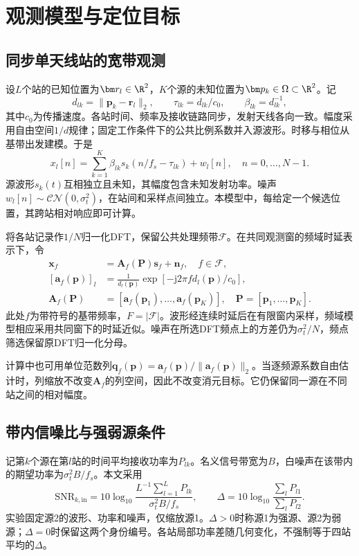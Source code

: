 \section{观测模型与定位目标}\label{sec:model}
\subsection{同步单天线站的宽带观测}
设$L$个站的已知位置为$\bm r_l\in\R^2$，$K$个源的未知位置为$\bm p_k\in\Omega\subset\R^2$。记
\begin{equation}
 d_{lk}=\|\bm p_k-\bm r_l\|_2,\qquad
 \tau_{lk}=d_{lk}/c_0,\qquad \beta_{lk}=d_{lk}^{-1},
 \label{eq:distance}
\end{equation}
其中$c_0$为传播速度。各站时间、频率及接收链路同步，发射天线各向一致。幅度采用自由空间$1/d$规律；固定工作条件下的公共比例系数并入源波形。时移与相位从基带出发建模。于是
\begin{equation}
 x_l[n]=\sum_{k=1}^{K}\beta_{lk}s_k(n/f_s-\tau_{lk})+w_l[n],
 \quad n=0,\ldots,N-1 .\label{eq:time}
\end{equation}
源波形$s_k(t)$互相独立且未知，其幅度包含未知发射功率。噪声$w_l[n]\sim\mathcal{CN}(0,\sigma_t^2)$，在站间和采样点间独立。本模型中，每给定一个候选位置，其跨站相对响应即可计算。

将各站记录作$1/N$归一化DFT，保留公共处理频带$\mathcal F$。在共同观测窗的频域时延表示下，令
\begin{align}
 \bm x_f&=\bm A_f(\bm P)\bm s_f+\bm n_f,\quad f\in\mathcal F,\label{eq:frequency}\\
 [\bm a_f(\bm p)]_l&=\frac{1}{d_l(\bm p)}
       \exp[-\mathrm j2\pi f d_l(\bm p)/c_0],\label{eq:response}\\
 \bm A_f(\bm P)&=[\bm a_f(\bm p_1),\ldots,\bm a_f(\bm p_K)],\quad
 \bm P=[\bm p_1,\ldots,\bm p_K].\nonumber
\end{align}
此处$f$为带符号的基带频率，$F=|\mathcal F|$。波形经连续时延后在有限窗内采样，频域模型相应采用共同窗下的时延近似。噪声在所选DFT频点上的方差仍为$\sigma_t^2/N$，频点筛选保留原DFT归一化分母。

计算中也可用单位范数列$\bm q_f(\bm p)=\bm a_f(\bm p)/\|\bm a_f(\bm p)\|_2$。当逐频源系数自由估计时，列缩放不改变$\bm A_f$的列空间，因此不改变消元目标。它仍保留同一源在不同站之间的相对幅度。

\subsection{带内信噪比与强弱源条件}
记第$k$个源在第$l$站的时间平均接收功率为$P_{lk}$。名义信号带宽为$B$，白噪声在该带内的期望功率为$\sigma_t^2B/f_s$。本文采用
\begin{equation}
 \mathrm{SNR}_{k,\mathrm{in}}
 =10\log_{10}\frac{L^{-1}\sum_{l=1}^L P_{lk}}
 {\sigma_t^2B/f_s},\qquad
 \Delta=10\log_{10}\frac{\sum_l P_{l1}}{\sum_l P_{l2}} .
 \label{eq:snr}
\end{equation}
实验固定源2的波形、功率和噪声，仅缩放源1。$\Delta>0$时称源1为强源、源2为弱源；$\Delta=0$时保留这两个身份编号。各站局部功率差随几何变化，不强制等于四站平均的$\Delta$。

